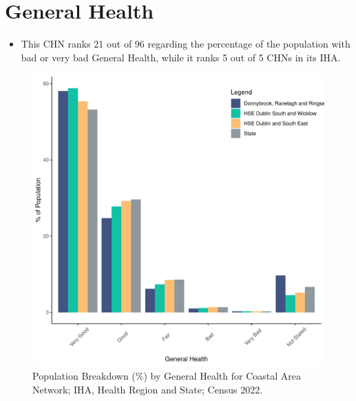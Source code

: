 \documentclass{article}
\begin{document}
\pagebreak

\section{General Health}\label{sect:GenHealth}
\begin{itemize}
\item  This CHN ranks  21 out of 96 regarding the percentage of the population with bad or very bad General Health, while it ranks   5 out of 5 CHNs in its IHA.
\end{itemize}
\begin{figure}[h]
	\centering
	\includegraphics[width = 150mm]{../figures/GenED.pdf}
	\caption{Population Breakdown (\%) by General Health for Coastal Area Network; IHA, Health Region and State;  Census 2022.}
	\label{fig:2ae19629-1a6a-13a3-e055-000000000001}
	\end{figure}
\end{document}
